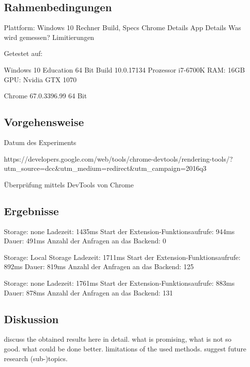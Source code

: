 \subsection{Rahmenbedingungen}
\label{ss:method2}

Plattform: Windows 10 Rechner Build, Specs
Chrome Details
App Details
Was wird gemessen?
Limitierungen

Getestet auf:

Windows 10 Education 64 Bit
Build 10.0.17134
Prozessor i7-6700K
RAM: 16GB
GPU: Nvidia GTX 1070

Chrome  67.0.3396.99 64 Bit


\subsection{Vorgehensweise}
\label{ss:datasource2}

Datum des Experiments

https://developers.google.com/web/tools/chrome-devtools/rendering-tools/?utm_source=dcc&utm_medium=redirect&utm_campaign=2016q3

Überprüfung mittels DevTools von Chrome

\subsection{Ergebnisse}
\label{ss:results2}

Storage: none
Ladezeit: 1435ms
Start der Extension-Funktionsaufrufe: 944ms
Dauer: 491ms
Anzahl der Anfragen an das Backend: 0


Storage: Local Storage
Ladezeit: 1711ms
Start der Extension-Funktionsaufrufe: 892ms
Dauer: 819ms
Anzahl der Anfragen an das Backend: 125


Storage: none
Ladezeit: 1761ms
Start der Extension-Funktionsaufrufe: 883ms
Dauer: 878ms
Anzahl der Anfragen an das Backend: 131




\subsection{Diskussion}
\label{ss:discussion_details2}

discuss the obtained results here in detail. what is promising, what is not so good. what could be done better. limitations of the used methods. suggest future research (sub-)topics.










